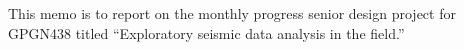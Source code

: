 \documentclass[a4paper,12pt]{texMemo}
\begin{document}
\maketitle

This memo is to report on the monthly progress senior design project for GPGN438 titled ``Exploratory seismic data analysis in the field.'' \\
\end{document}
